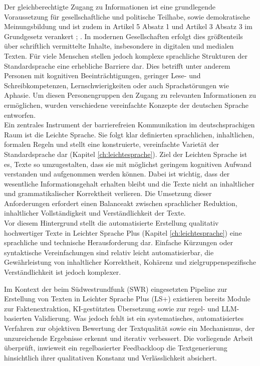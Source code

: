 Der gleichberechtigte Zugang zu Informationen ist eine grundlegende Voraussetzung für gesellschaftliche und politische Teilhabe, sowie demokratische Meinungsbildung und ist zudem in Artikel 5 Absatz 1 und Artikel 3 Absatz 3 im Grundgesetz verankert \cite{gg_art3}; \cite{gg_art5}.
In modernen Gesellschaften erfolgt dies größtenteils über schriftlich vermittelte Inhalte, insbesondere in digitalen und medialen Texten.
Für viele Menschen stellen jedoch komplexe sprachliche Strukturen der Standardsprache eine erhebliche Barriere dar.
Dies betrifft unter anderem Personen mit kognitiven Beeinträchtigungen, geringer Lese- und Schreibkompetenzen, Lernschwierigkeiten oder auch Sprachstörungen wie Aphasie.
Um diesen Personengruppen den Zugang zu relevanten Informationen zu ermöglichen, wurden verschiedene vereinfachte Konzepte der deutschen Sprache entworfen.\\
Ein zentrales Instrument der barrierefreien Kommunikation im deutschsprachigen Raum ist die Leichte Sprache.
Sie folgt klar definierten sprachlichen, inhaltlichen, formalen Regeln und stellt eine konstruierte, vereinfachte Varietät der Standardsprache dar (Kapitel \ref{ch:leichtesprache}).
Ziel der Leichten Sprache ist es, Texte so umzugestalten, dass sie mit möglichst geringem kognitiven Aufwand verstanden und aufgenommen werden können.
Dabei ist wichtig, dass der wesentliche Informationsgehalt erhalten bleibt und die Texte nicht an inhaltlicher und grammatikalischer Korrektheit verlieren.
Die Umsetzung dieser Anforderungen erfordert einen Balanceakt zwischen sprachlicher Reduktion, inhaltlicher Vollständigkeit und Verständlichkeit der Texte.\\
Vor diesem Hintergrund stellt die automatisierte Erstellung qualitativ hochwertiger Texte in Leichter Sprache Plus (Kapitel \ref{ch:leichtesprache}) eine sprachliche und technische Herausforderung dar.
Einfache Kürzungen oder syntaktische Vereinfachungen sind relativ leicht automatisierbar, die Gewährleistung von inhaltlicher Korrektheit, Kohärenz und zielgruppenspezifische Verständlichkeit ist jedoch komplexer.

Im Kontext der beim Südwestrundfunk (SWR) eingesetzten Pipeline zur Erstellung von Texten in Leichter Sprache Plus (LS+) existieren bereits Module zur Faktenextraktion, KI-gestützten Übersetzung sowie zur regel- und LLM-basierten Validierung.
Was jedoch fehlt ist ein systematisches, automatisiertes Verfahren zur objektiven Bewertung der Textqualität sowie ein Mechanismus, der unzureichende Ergebnisse erkennt und iterativ verbessert.
Die vorliegende Arbeit überprüft, inwieweit ein regelbasierter Feedbackloop die Textgenerierung hinsichtlich ihrer qualitativen Konstanz und Verlässlichkeit absichert.